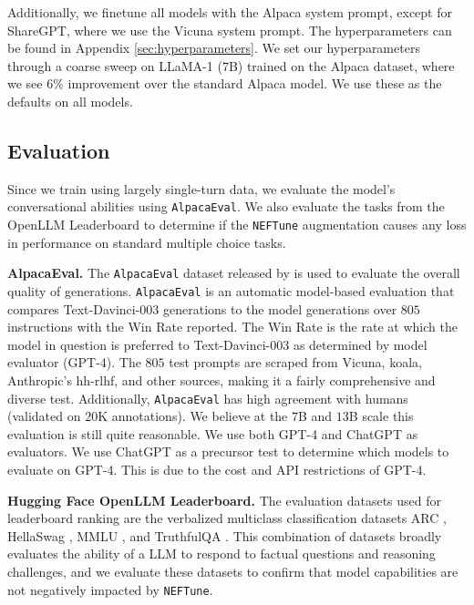 \documentclass{article} %
\newcommand{\neftune}{\texttt{NEFTune}}
\newcommand{\llama}{LLaMA}
\begin{document}
Additionally, we finetune all models with the Alpaca system prompt, except for ShareGPT, where we use the Vicuna system prompt. The hyperparameters can be found in Appendix \ref{sec:hyperparameters}. We set our hyperparameters through a coarse sweep on \llama{}-1 ($7$B) trained on the Alpaca dataset, where we see $6\%$ improvement over the standard Alpaca model. We use these as the defaults on all models. 

\subsection{Evaluation} \label{sec:Evaluations}

Since we train using largely single-turn data, we evaluate the model's conversational abilities using \texttt{AlpacaEval}. We also evaluate the tasks from the OpenLLM Leaderboard to determine if the \neftune{} augmentation causes any loss in performance on standard multiple choice tasks.

\textbf{AlpacaEval.}  The \texttt{AlpacaEval} dataset released by \citet{dubois2023alpacafarm} is used to evaluate the overall quality of generations. \texttt{AlpacaEval} is an automatic model-based evaluation that compares Text-Davinci-003 generations to the model generations over $805$ instructions with the Win Rate reported. The Win Rate is the rate at which the model in question is preferred to Text-Davinci-003 as determined by model evaluator (GPT-4). The $805$ test prompts are scraped from Vicuna, koala, Anthropic's hh-rlhf, and other sources, making it a fairly comprehensive and diverse test. Additionally, \texttt{AlpacaEval} has high agreement with humans \citep{dubois2023alpacafarm}  (validated on $20$K annotations). We believe at the $7$B and $13$B scale this evaluation is still quite reasonable. 
We use both GPT-4 and ChatGPT as evaluators. We use ChatGPT as a precursor test to determine which models to evaluate on GPT-4. This is due to the cost and API restrictions of GPT-4.


\textbf{Hugging Face OpenLLM Leaderboard.} The evaluation datasets used for leaderboard ranking are the verbalized multiclass classification datasets ARC \citep{clark2018think}, HellaSwag \citep{zellers-etal-2019-hellaswag}, MMLU \citep{hendrycks2020measuring-MMLU}, and TruthfulQA \citep{lin-etal-2022-truthfulqa}. This combination of datasets broadly evaluates the ability of a LLM to respond to factual questions and reasoning challenges, and we evaluate these datasets to confirm that model capabilities are not negatively impacted by \neftune{}.
\end{document}
